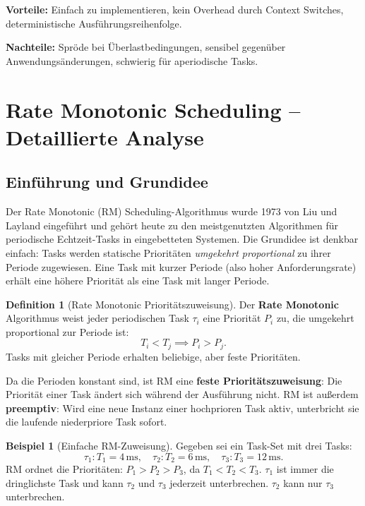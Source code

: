 ﻿\documentclass[a4paper,12pt]{report}
\theoremstyle{definition}
\newtheorem{definition}{Definition}[chapter]
\newtheorem{beispiel}{Beispiel}[chapter]
\begin{document}
\textbf{Vorteile:} Einfach zu implementieren, kein Overhead durch Context Switches,
deterministische Ausführungsreihenfolge.

\textbf{Nachteile:} Spröde bei Überlastbedingungen, sensibel gegenüber
Anwendungsänderungen, schwierig für aperiodische Tasks.

\section{Rate Monotonic Scheduling -- Detaillierte Analyse}

\subsection{Einführung und Grundidee}

Der Rate Monotonic (RM) Scheduling-Algorithmus wurde 1973 von Liu und Layland
eingeführt \cite{Liu1973} und gehört heute zu den meistgenutzten Algorithmen für
periodische Echtzeit-Tasks in eingebetteten Systemen. Die Grundidee ist denkbar
einfach: Tasks werden statische Prioritäten \emph{umgekehrt proportional} zu ihrer
Periode zugewiesen. Eine Task mit kurzer Periode (also hoher Anforderungsrate) erhält
eine höhere Priorität als eine Task mit langer Periode.

\begin{definition}[Rate Monotonic Prioritätszuweisung]
	Der \textbf{Rate Monotonic} Algorithmus weist jeder periodischen Task $\tau_i$
	eine Priorität $P_i$ zu, die umgekehrt proportional zur Periode ist:
	\[
		T_i < T_j \implies P_i > P_j.
	\]
	Tasks mit gleicher Periode erhalten beliebige, aber feste Prioritäten.
\end{definition}

Da die Perioden konstant sind, ist RM eine \textbf{feste Prioritätszuweisung}: Die
Priorität einer Task ändert sich während der Ausführung nicht. RM ist außerdem
\textbf{preemptiv}: Wird eine neue Instanz einer hochprioren Task aktiv, unterbricht
sie die laufende niederpriore Task sofort.

\begin{beispiel}[Einfache RM-Zuweisung]
	Gegeben sei ein Task-Set mit drei Tasks:
	\[
		\tau_1: T_1 = 4\,\text{ms}, \quad \tau_2: T_2 = 6\,\text{ms}, \quad \tau_3: T_3 = 12\,\text{ms}.
	\]
	RM ordnet die Prioritäten: $P_1 > P_2 > P_3$, da $T_1 < T_2 < T_3$.
	$\tau_1$ ist immer die dringlichste Task und kann $\tau_2$ und $\tau_3$ jederzeit
	unterbrechen. $\tau_2$ kann nur $\tau_3$ unterbrechen.
\end{beispiel}
\end{document}
